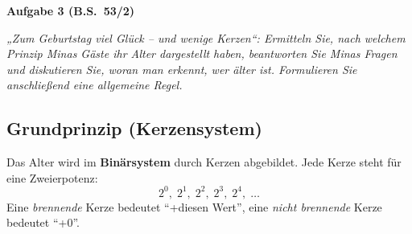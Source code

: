 \documentclass[a4paper,12pt]{article}
\begin{document}
                                                                           \bigskip

                                                                           \textbf{Aufgabe 3 (B.S.\ 53/2)}

                                                                           \emph{„Zum Geburtstag viel Glück – und wenige Kerzen“: Ermitteln Sie, nach welchem Prinzip Minas Gäste ihr Alter dargestellt haben, beantworten Sie Minas Fragen und diskutieren Sie, woran man erkennt, wer älter ist. Formulieren Sie anschließend eine allgemeine Regel.}

                                                                           \subsection*{Grundprinzip (Kerzensystem)}
                                                                           Das Alter wird im \textbf{Binärsystem} durch Kerzen abgebildet. Jede Kerze steht für eine Zweierpotenz:
                                                                           \[
                                                                             2^0, \; 2^1, \; 2^2, \; 2^3, \; 2^4, \;\dots
                                                                             \]
                                                                             Eine \emph{brennende} Kerze bedeutet ``+diesen Wert'', eine \emph{nicht brennende} Kerze bedeutet ``+0''.
\end{document}
